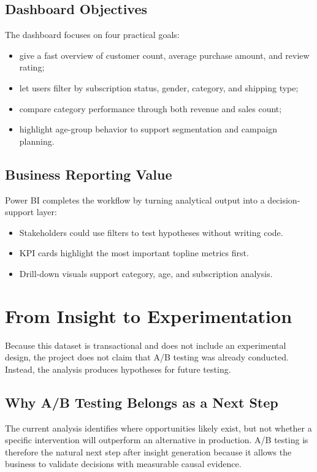 \documentclass[12pt,a4paper]{article}
\begin{document}
\subsection{Dashboard Objectives}
The dashboard focuses on four practical goals:
\begin{itemize}
  \item give a fast overview of customer count, average purchase amount, and review rating;
  \item let users filter by subscription status, gender, category, and shipping type;
  \item compare category performance through both revenue and sales count;
  \item highlight age-group behavior to support segmentation and campaign planning.
\end{itemize}

\subsection{Business Reporting Value}
Power BI completes the workflow by turning analytical output into a decision-support layer:
\begin{itemize}
  \item Stakeholders could use filters to test hypotheses without writing code.
  \item KPI cards highlight the most important topline metrics first.
  \item Drill-down visuals support category, age, and subscription analysis.
\end{itemize}

\section{From Insight to Experimentation}
Because this dataset is transactional and does not include an experimental design, the project does not claim that A/B testing was already conducted. Instead, the analysis produces hypotheses for future testing.

\subsection{Why A/B Testing Belongs as a Next Step}
The current analysis identifies where opportunities likely exist, but not whether a specific intervention will outperform an alternative in production. A/B testing is therefore the natural next step after insight generation because it allows the business to validate decisions with measurable causal evidence.
\end{document}
